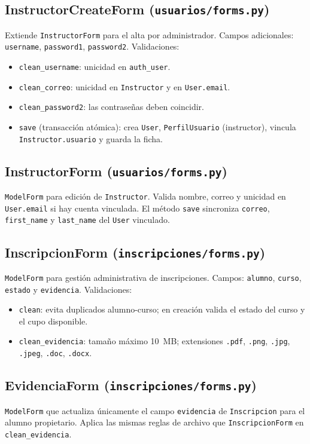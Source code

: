 \documentclass[11pt,letterpaper]{article}
\begin{document}
	\subsection{InstructorCreateForm (\texttt{usuarios/forms.py})}
	Extiende \texttt{InstructorForm} para el alta por administrador. Campos adicionales: \texttt{username}, \texttt{password1}, \texttt{password2}. Validaciones:
	\begin{itemize}[leftmargin=*]
		\item \texttt{clean\_username}: unicidad en \texttt{auth\_user}.
		\item \texttt{clean\_correo}: unicidad en \texttt{Instructor} y en \texttt{User.email}.
		\item \texttt{clean\_password2}: las contrase\~nas deben coincidir.
		\item \texttt{save} (transacci\'on at\'omica): crea \texttt{User}, \texttt{PerfilUsuario} (instructor), vincula \texttt{Instructor.usuario} y guarda la ficha.
	\end{itemize}
	
	\subsection{InstructorForm (\texttt{usuarios/forms.py})}
	\texttt{ModelForm} para edici\'on de \texttt{Instructor}. Valida nombre, correo y unicidad en \texttt{User.email} si hay cuenta vinculada. El m\'etodo \texttt{save} sincroniza \texttt{correo}, \texttt{first\_name} y \texttt{last\_name} del \texttt{User} vinculado.
	
	\subsection{InscripcionForm (\texttt{inscripciones/forms.py})}
	\texttt{ModelForm} para gesti\'on administrativa de inscripciones. Campos: \texttt{alumno}, \texttt{curso}, \texttt{estado} y \texttt{evidencia}. Validaciones:
	\begin{itemize}[leftmargin=*]
		\item \texttt{clean}: evita duplicados alumno-curso; en creaci\'on valida el estado del curso y el cupo disponible.
		\item \texttt{clean\_evidencia}: tama\~no m\'aximo 10~MB; extensiones \texttt{.pdf}, \texttt{.png}, \texttt{.jpg}, \texttt{.jpeg}, \texttt{.doc}, \texttt{.docx}.
	\end{itemize}
	
	\subsection{EvidenciaForm (\texttt{inscripciones/forms.py})}
	\texttt{ModelForm} que actualiza \'unicamente el campo \texttt{evidencia} de \texttt{Inscripcion} para el alumno propietario. Aplica las mismas reglas de archivo que \texttt{InscripcionForm} en \texttt{clean\_evidencia}.
	
\end{document}
